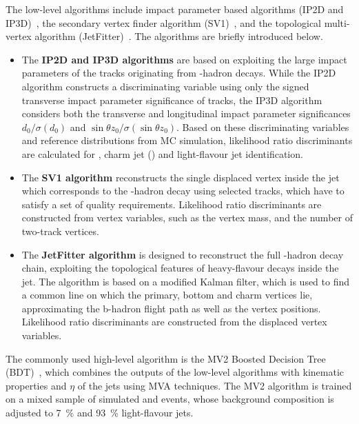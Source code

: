 The low-level \btagging algorithms include impact parameter based algorithms (IP2D and IP3D)~\cite{ATL-PHYS-PUB-2017-013}, the secondary vertex finder algorithm (SV1)~\cite{ATL-PHYS-PUB-2017-011}, and the topological multi-vertex algorithm (JetFitter)~\cite{ATL-PHYS-PUB-2018-025}. The algorithms are briefly introduced below.
\begin{itemize}
	\item The \textbf{IP2D and IP3D algorithms} are based on exploiting the large impact parameters of the tracks originating from \PB-hadron decays. While the IP2D algorithm constructs a discriminating variable using only the signed transverse impact parameter significance of tracks, the IP3D algorithm considers both the transverse and longitudinal impact parameter significances \(d_{0} / \sigma(d_{0})\) and \(\sin \theta z_{0} / \sigma(\sin \theta z_{0})\). Based on these discriminating variables and reference distributions from MC simulation, likelihood ratio discriminants are calculated for \bjet, charm jet (\cjet) and light-flavour jet identification.

	\item The \textbf{SV1 algorithm} reconstructs the single displaced vertex inside the jet which corresponds to the \PB-hadron decay using selected tracks, which have to satisfy a set of quality requirements. Likelihood ratio discriminants are constructed from vertex variables, such as the vertex mass, and the number of two-track vertices.

	\item The \textbf{JetFitter algorithm} is designed to reconstruct the full \PB-hadron decay chain, exploiting the topological features of heavy-flavour decays inside the jet. The algorithm is based on a modified Kalman filter, which is used to find a common line on which the primary, bottom and charm vertices lie, approximating the b-hadron flight path as well as the vertex positions. Likelihood ratio discriminants are constructed from the displaced vertex variables.
\end{itemize}

The commonly used high-level \btagging algorithm is the MV2 Boosted Decision Tree (BDT)~\cite{ATL-PHYS-PUB-2017-013}, which combines the outputs of the low-level \btagging algorithms with kinematic properties \pt and \(\eta\) of the jets using MVA techniques. The MV2 algorithm is trained on a mixed sample of simulated \ttbar and \PZprime events, whose background composition is adjusted to \SI{7}{\percent} \cjets and \SI{93}{\percent} light-flavour jets.

